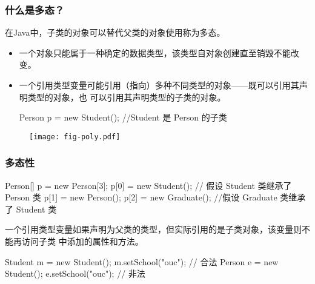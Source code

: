 \begin{frame}[fragile] %
  \frametitle{什么是多态？}

  在Java中，子类的对象可以替代父类的对象使用称为{\hei 多态}。

  
  \begin{itemize}[<+-| structure@+>]\kai
  \item 一个对象只能属于一种确定的数据类型，该类型自对象创建直至销毁不能改变。
  \item 一个引用类型变量可能引用（指向）多种不同类型的对象{\Red ——既可以引用其声明类型的对象，也
    可以引用其声明类型的子类的对象。}
    \begin{javaCode}
      Person p = new Student(); //Student 是 Person 的子类  
    \end{javaCode}
  \end{itemize}

  \begin{figure}
    \centering
    \texttt{[image: fig-poly.pdf]}
  \end{figure}
\end{frame}

\begin{frame}[fragile] %
\frametitle{多态性}


\begin{javaCode}
  Person[] p = new Person[3]; 
  p[0] = new Student(); // 假设 Student 类继承了 Person 类
  p[1] = new Person();
  p[2] = new Graduate(); //假设 Graduate 类继承了 Student 类
\end{javaCode}

\pause


一个引用类型变量如果声明为父类的类型，但实际引用的是子类对象，该变量则不能再访问子类
中添加的属性和方法。

\begin{javaCode}
  Student m = new Student();
  m.setSchool("ouc"); // 合法
  Person e = new Student();
  e.setSchool("ouc"); // 非法
\end{javaCode}

\end{frame}

